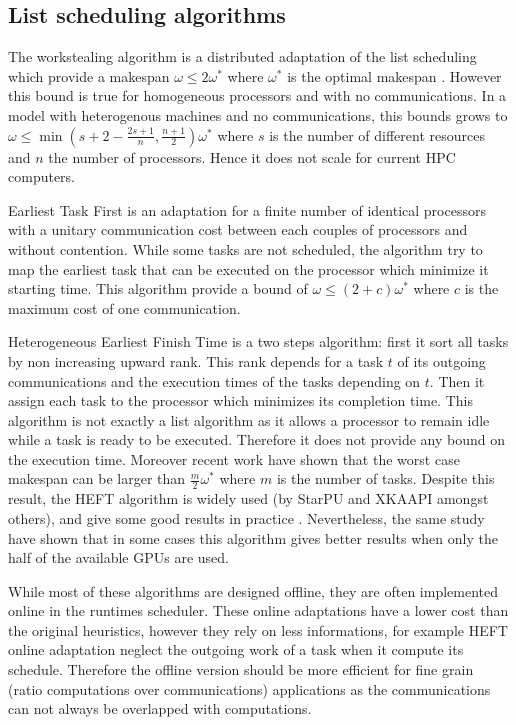 \documentclass[10pt, conference, compsocconf,pdftex,dvipsnames]{IEEEtran}
\begin{document}
\subsection{List scheduling algorithms}

The workstealing algorithm is a distributed adaptation of the list scheduling
which provide a makespan $\omega\leq2\omega^*$ where $\omega^*$ is the optimal
makespan \cite{GrahamRL1966Bounds, GrahamRL1969Bounds}. However this bound is
true for homogeneous processors and with no communications. In a model with
heterogenous machines and no communications, this bounds grows to
$\omega\leq\min(s+2-\frac{2s+1}{n},\frac{n+1}{2})\omega^*$ where $s$ is the
number of different resources and $n$ the number of processors. Hence it
does not scale for current HPC computers. 

Earliest Task First\cite{hwang1989scheduling} is an adaptation for a finite
number of identical processors with a unitary communication cost between each
couples of processors and without contention. While some tasks are not
scheduled, the algorithm try to map the earliest task that can be executed on
the processor which minimize it starting time. This algorithm provide a bound
of $\omega\leq(2+c)\omega^*$ where $c$ is the maximum cost of one
communication.  

Heterogeneous Earliest Finish Time \cite{topcuoglu2002performance}  is a two
steps algorithm: first it sort all tasks by non increasing upward rank. This
rank depends for a task $t$ of its outgoing communications and the execution
times of the tasks depending on $t$. Then it assign each task to the processor
which minimizes its completion time. This algorithm is not exactly a list
algorithm as it allows a processor to remain idle while a task is ready to be
executed.  Therefore it does not provide any bound on the execution time.
Moreover recent work \cite{Kedad-SidhoumMonnaMounieEtAl2013} have shown that
the worst case makespan can be larger than $\frac{m}{2}\omega^*$ where
$m$ is the number of tasks. Despite this result, the HEFT algorithm is widely
used (by StarPU and XKAAPI amongst others), and give some good results in
practice \cite{ferreiralima:hal-00735470}. Nevertheless, the same study have
shown that in some cases this algorithm gives better results when only the
half of the available GPUs are used.

While most of these algorithms are designed offline, they are often
implemented online in the runtimes scheduler. These online adaptations have a
lower cost than the original heuristics, however they rely on less
informations, for example HEFT online adaptation neglect the outgoing work of
a task when it compute its schedule. Therefore the offline version should be
more efficient for fine grain (ratio computations over communications)
applications as the communications can not always be overlapped with
computations.
\end{document}
